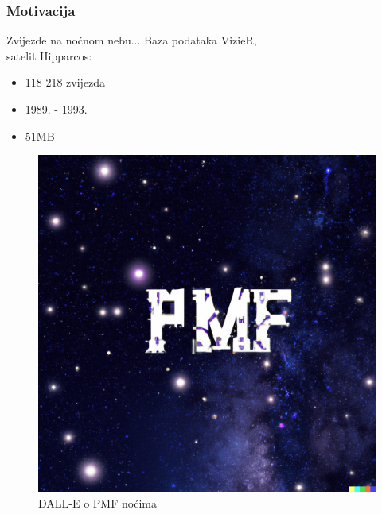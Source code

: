 




\frame{\titlepage} 

\begin{frame}
	\frametitle{Motivacija}
    \begin{minipage}{0.55\linewidth}
      Zvijezde na noćnom nebu...\newline \pause
      Baza podataka VizieR,\\ satelit Hipparcos:\pause
      \begin{itemize}
        \item 118 218 zvijezda
        \item 1989. - 1993.
        \item 51MB
      \end{itemize}
      \pause
    \end{minipage}
    \begin{minipage}{0.40\linewidth}
      \begin{figure}
        \centering
        \includegraphics[width=\textwidth]{assets/prez-starry_night.png}
        \caption{DALL-E o PMF noćima} \label{fig:starry_night}
      \end{figure}
    \end{minipage}
\end{frame}

